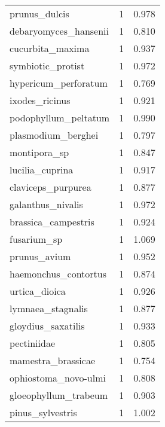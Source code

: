 \begin{tabular}{lrr}
                  prunus\_dulcis &                   1 &     0.978 \\
          debaryomyces\_hansenii &                   1 &     0.810 \\
               cucurbita\_maxima &                   1 &     0.937 \\
              symbiotic\_protist &                   1 &     0.972 \\
           hypericum\_perforatum &                   1 &     0.769 \\
                 ixodes\_ricinus &                   1 &     0.921 \\
           podophyllum\_peltatum &                   1 &     0.990 \\
             plasmodium\_berghei &                   1 &     0.797 \\
                   montipora\_sp &                   1 &     0.847 \\
                lucilia\_cuprina &                   1 &     0.917 \\
             claviceps\_purpurea &                   1 &     0.877 \\
              galanthus\_nivalis &                   1 &     0.972 \\
            brassica\_campestris &                   1 &     0.924 \\
                    fusarium\_sp &                   1 &     1.069 \\
                   prunus\_avium &                   1 &     0.952 \\
           haemonchus\_contortus &                   1 &     0.874 \\
                  urtica\_dioica &                   1 &     0.926 \\
              lymnaea\_stagnalis &                   1 &     0.877 \\
             gloydius\_saxatilis &                   1 &     0.933 \\
                    pectiniidae &                   1 &     0.805 \\
             mamestra\_brassicae &                   1 &     0.754 \\
           ophiostoma\_novo-ulmi &                   1 &     0.808 \\
           gloeophyllum\_trabeum &                   1 &     0.903 \\
               pinus\_sylvestris &                   1 &     1.002 \\

\end{tabular}
